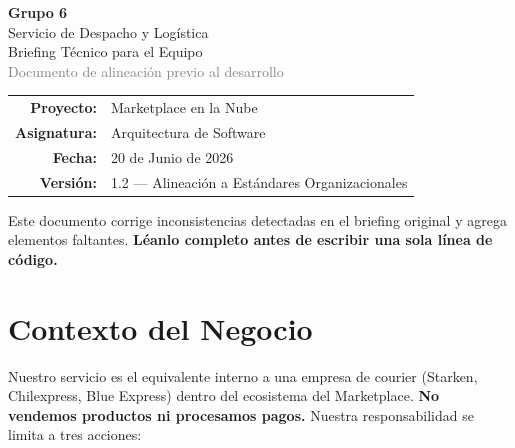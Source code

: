\documentclass[11pt, a4paper]{article}
\begin{document}
\begin{titlepage}
\centering
\vspace*{3cm}

{\Huge\bfseries\textcolor{primary}{Grupo 6}}\\[0.4cm]
{\LARGE\textcolor{primary!70}{Servicio de Despacho y Logística}}\\[1.5cm]

{\Large Briefing Técnico para el Equipo}\\[0.3cm]
{\large\textcolor{gray}{Documento de alineación previo al desarrollo}}\\[3cm]

\begin{tabular}{rl}
  \textbf{Proyecto:}  & Marketplace en la Nube \\
  \textbf{Asignatura:}& Arquitectura de Software \\
  \textbf{Fecha:}     & 20 de Junio de 2026 \\
  \textbf{Versión:}   & 1.2 --- Alineación a Estándares Organizacionales \\
\end{tabular}

\vfill

\begin{warningbox}[title={\faExclamationCircle\quad Antes de leer}]
  Este documento corrige inconsistencias detectadas en el briefing original
  y agrega elementos faltantes. \textbf{Léanlo completo antes de escribir
  una sola línea de código.}
\end{warningbox}

\end{titlepage}

\tableofcontents
\newpage

\section{Contexto del Negocio}

Nuestro servicio es el equivalente interno a una empresa de courier (Starken, Chilexpress, Blue Express) dentro del ecosistema del Marketplace. \textbf{No vendemos productos ni procesamos pagos.} Nuestra responsabilidad se limita a tres acciones:
\end{document}
